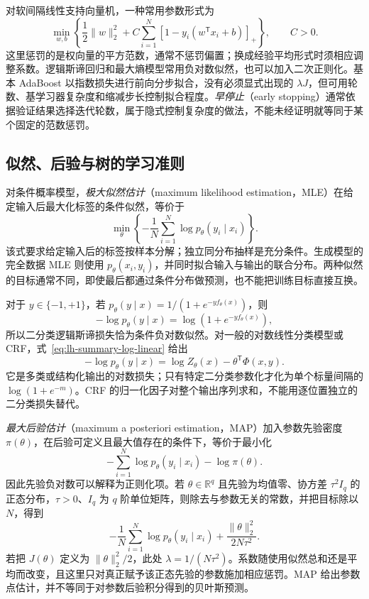 对软间隔线性支持向量机，一种常用参数形式为
\begin{equation}
\min_{w,b}\left\{\frac12\|w\|_2^2
+C\sum_{i=1}^N[1-y_i(w^{\mathsf T}x_i+b)]_+\right\},\qquad C>0.
\label{eq:lh-summary-svm-objective}
\end{equation}
这里惩罚的是权向量的平方范数，通常不惩罚偏置；换成经验平均形式时须相应调整系数。逻辑斯谛回归和最大熵模型常用负对数似然，也可以加入二次正则化。基本 AdaBoost 以指数损失进行前向分步拟合，没有必须显式出现的 $\lambda J$，但可用轮数、基学习器复杂度和缩减步长控制拟合程度。\emph{早停止}（early stopping）通常依据验证结果选择迭代轮数，属于隐式控制复杂度的做法，不能未经证明就等同于某个固定的范数惩罚。

\subsection{似然、后验与树的学习准则}
\label{subsec:lh-summary-likelihood}

对条件概率模型，\emph{极大似然估计}（maximum likelihood estimation，MLE）在给定输入后最大化标签的条件似然，等价于
\begin{equation}
\min_\theta\left\{-\frac1N\sum_{i=1}^N\log p_\theta(y_i\mid x_i)\right\}.
\label{eq:lh-summary-conditional-mle}
\end{equation}
该式要求给定输入后的标签按样本分解；独立同分布抽样是充分条件。生成模型的完全数据 MLE 则使用 $p_\theta(x_i,y_i)$，并同时拟合输入与输出的联合分布。两种似然的目标通常不同，即使最后都通过条件分布做预测，也不能把训练目标直接互换。

对于 $y\in\{-1,+1\}$，若 $p_\theta(y\mid x)=1/(1+e^{-yf_\theta(x)})$，则
\[
-\log p_\theta(y\mid x)=\log(1+e^{-yf_\theta(x)}),
\]
所以二分类逻辑斯谛损失恰为条件负对数似然。对一般的对数线性分类模型或 CRF，式~\eqref{eq:lh-summary-log-linear} 给出
\begin{equation}
-\log p_\theta(y\mid x)=\log Z_\theta(x)-\theta^{\mathsf T}\Phi(x,y).
\label{eq:lh-summary-loglinear-nll}
\end{equation}
它是多类或结构化输出的对数损失；只有特定二分类参数化才化为单个标量间隔的 $\log(1+e^{-m})$。CRF 的归一化因子对整个输出序列求和，不能用逐位置独立的二分类损失替代。

\emph{最大后验估计}（maximum a posteriori estimation，MAP）加入参数先验密度 $\pi(\theta)$，在后验可定义且最大值存在的条件下，等价于最小化
\begin{equation}
-\sum_{i=1}^N\log p_\theta(y_i\mid x_i)-\log\pi(\theta).
\label{eq:lh-summary-map-objective}
\end{equation}
因此先验负对数可以解释为正则化项。若 $\theta\in\mathbb R^q$ 且先验为均值零、协方差 $\tau^2 I_q$ 的正态分布，$\tau>0$、$I_q$ 为 $q$ 阶单位矩阵，则除去与参数无关的常数，并把目标除以 $N$，得到
\begin{equation}
-\frac1N\sum_{i=1}^N\log p_\theta(y_i\mid x_i)
+\frac{\|\theta\|_2^2}{2N\tau^2}.
\label{eq:lh-summary-gaussian-map}
\end{equation}
若把 $J(\theta)$ 定义为 $\|\theta\|_2^2/2$，此处 $\lambda=1/(N\tau^2)$。系数随使用似然总和还是平均而改变，且这里只对真正赋予该正态先验的参数施加相应惩罚。MAP 给出参数点估计，并不等同于对参数后验积分得到的贝叶斯预测。

